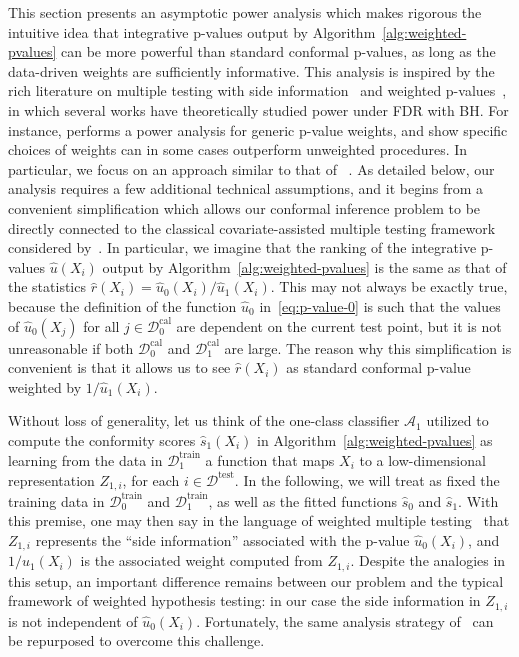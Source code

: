 \documentclass[11pt]{article}
\begin{document}
This section presents an asymptotic power analysis which makes rigorous the intuitive idea that integrative p-values output by Algorithm~\ref{alg:weighted-pvalues} can be more powerful than standard conformal p-values, as long as the data-driven weights are sufficiently informative. This analysis is inspired by the rich literature on multiple testing with side information~\cite{lei2018adapt} and weighted p-values~\cite{genovese2006false,hu2010false,efron2012large,ignatiadis2016data,li2019multiple,ignatiadis2021covariate,Caietal20,basu2018weighted, benjamini1997weights, roquain2008optimal}, in which several works have theoretically studied power under FDR with BH. For instance, \cite{genovese2006false} performs a power analysis for generic p-value weights, and \cite{Caietal20,liang2022locally} show specific choices of weights can in some cases outperform unweighted procedures. In particular, we focus on an approach similar to that of ~\cite{Caietal20,liang2022locally}. As detailed below, our analysis requires a few additional technical assumptions, and it begins from a convenient simplification which allows our conformal inference problem to be directly connected to the classical covariate-assisted multiple testing framework considered by~\cite{Caietal20,liang2022locally}.
In particular, we imagine that the ranking of the integrative p-values $\hat{u}(X_i)$ output by Algorithm~\ref{alg:weighted-pvalues} is the same as that of the statistics $\hat{r}(X_i) = \hat{u}_0(X_i) / \hat{u}_1(X_i)$.
This may not always be exactly true, because the definition of the function $\hat{u}_0$ in~\eqref{eq:p-value-0} is such that the values of $\hat{u}_0(X_j)$ for all $j \in \mathcal{D}_0^{\mathrm{cal}}$ are dependent on the current test point, but it is not unreasonable if both $\mathcal{D}_0^{\mathrm{cal}}$ and $\mathcal{D}_1^{\mathrm{cal}}$ are large.
The reason why this simplification is convenient is that it allows us to see $\hat{r}(X_i)$ as standard conformal p-value weighted by $1/ \hat{u}_1(X_i)$.

Without loss of generality, let us think of the one-class classifier $\mathcal{A}_1$ utilized to compute the conformity scores $\hat{s}_1(X_i)$ in Algorithm~\ref{alg:weighted-pvalues} as learning from the data in $\mathcal{D}_1^{\mathrm{train}}$ a function that maps $X_i$ to a low-dimensional representation $Z_{1,i}$, for each $i \in \mathcal{D}^{\mathrm{test}}$.
In the following, we will treat as fixed the training data in $\mathcal{D}_0^{\mathrm{train}}$ and $\mathcal{D}_1^{\mathrm{train}}$, as well as the fitted functions $\hat{s}_0$ and $\hat{s}_1$. 
With this premise, one may then say in the language of weighted multiple testing~\cite{liang2022locally, Caietal20} that $Z_{1,i}$ represents the ``side information'' associated with the p-value $\hat{u}_0(X_i)$, and $1/\hat{u}_1(X_i)$ is the associated weight computed from $Z_{1,i}$.
Despite the analogies in this setup, an important difference remains between our problem and the typical framework of weighted hypothesis testing: in our case the side information in $Z_{1,i}$ is not independent of $\hat{u}_0(X_i)$.
Fortunately, the same analysis strategy of~\cite{liang2022locally, Caietal20} can be repurposed to overcome this challenge. 
\end{document}
